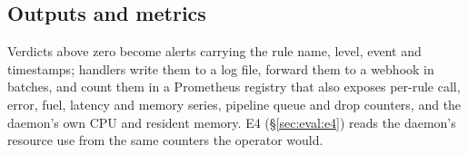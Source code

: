 \subsection{Outputs and metrics}
\label{sec:design:outputs}
Verdicts above zero become alerts carrying the rule name, level, event and
timestamps; handlers write them to a log file, forward them to a webhook
in batches, and count them in a Prometheus registry that also exposes
per-rule call, error, fuel, latency and memory series, pipeline queue and
drop counters, and the daemon's own CPU and resident memory. E4
(\S\ref{sec:eval:e4}) reads the daemon's resource use from the same
counters the operator would.
